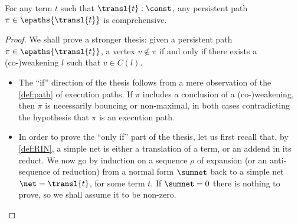 \begin{lemma}
\label{lem:comprehensiveness}
For any term $t$ such that $\transl{t}:\const$,
any persistent path $\pi\in\epaths{\transl{t}}$ is comprehensive.
\end{lemma}
\begin{proof}
We shall prove a stronger thesis:
given a persistent path $\pi\in\epaths{\transl{t}}$,
a vertex $v \notin \pi$ if and only if
there exists a (co-)weakening $l$ such that $v \in C(l)$.
\begin{itemize}
\item
  The ``if'' direction of the thesis follows from a mere observation of the 
  \autoref{def:path} of execution paths.
  If $\pi$ includes a conclusion of a (co-)weakening,
  then $\pi$ is necessarily bouncing or non-maximal,
  in both cases contradicting the hypothesis that $\pi$ is an execution path.

\item 
  In order to prove the ``only if'' part of the thesis,
  let us first recall that, by \autoref{def:RIN},
  a simple net is either a translation of a term, or an addend in its reduct.
  We now go by induction on a sequence $\rho$ of expansion (or an 
  anti-sequence of reduction) from a normal form $\sumnet$
  back to a simple net $\net = \transl{t}$, for some term $t$.
  If $\sumnet = 0$ there is nothing to prove,
  so we shall assume it to be non-zero.


\end{itemize}
\end{proof}
